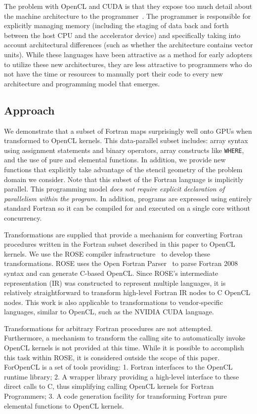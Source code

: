 The problem with OpenCL and CUDA is that they expose too much detail
about the machine architecture to the programmer~\citep{wolfe08gpgpu}.
The programmer is responsible for explicitly managing memory
(including the staging of data back and forth between the host CPU and
the accelerator device) and specifically taking into account
architectural differences (such as whether the architecture contains
vector units).  While these languages have been attractive as a method
for early adopters to utilize these new architectures, they are less
attractive to programmers who do not have the time or resources to
manually port their code to every new architecture and programming
model that emerges.


\subsection{Approach}

We demonstrate that a subset of Fortran maps surprisingly well onto
GPUs when transformed to OpenCL kernels.  This data-parallel subset
includes: array syntax using assignment statements and binary
operators, array constructs like {\tt WHERE}, and the use of pure and
elemental functions.  In addition, we provide new functions that
explicitly take advantage of the stencil geometry of the problem
domain we consider.  Note that this subset of the Fortran language is
implicitly parallel.  This programming model \emph{does not require
  explicit declaration of parallelism within the program.}  In
addition, programs are expressed using entirely standard Fortran so it
can be compiled for and executed on a single core without concurrency.

Transformations are supplied that provide a mechanism for converting
Fortran procedures written in the Fortran subset described in this
paper to OpenCL kernels.  We use the ROSE compiler
infrastructure~\citep{rose-web} to develop these transformations.
ROSE uses the Open Fortran Parser~\citep{ofp:sf} to parse Fortran 2008
syntax and can generate C-based OpenCL.  Since ROSE's intermediate
representation (IR) was constructed to represent multiple languages,
it is relatively straightforward to transform high-level Fortran IR
nodes to C OpenCL nodes.  This work is also applicable to
transformations to vendor-specific languages, similar to OpenCL, such
as the NVIDIA CUDA language.

Transformations for arbitrary Fortran procedures are not attempted.
Furthermore, a mechanism to transform the calling site to
automatically invoke OpenCL kernels is not provided at this time.
While it is possible to accomplish this task within ROSE, it is
considered outside the scope of this paper.  ForOpenCL is a set of
tools providing: 1. Fortran interfaces to the OpenCL runtime library;
2. A wrapper library providing a high-level interface to these direct
calls to C, thus simplifying calling OpenCL kernels for
Fortran Programmers; 3. A code generation facility for transforming
Fortran pure elemental functions to OpenCL kernels.

